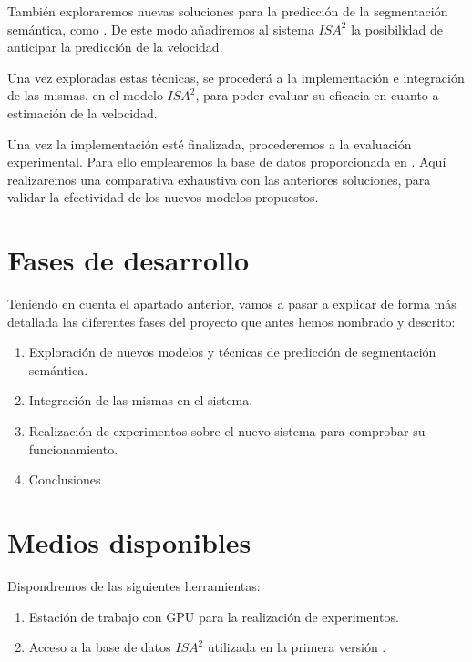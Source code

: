 \documentclass[12pt,oneside,a4paper]{article}
\begin{document}
También exploraremos nuevas soluciones para la predicción de la segmentación semántica, como \cite{segmpred}. De este modo añadiremos al sistema $ISA^2$ la posibilidad de anticipar la predicción de la velocidad.

Una vez exploradas estas técnicas, se procederá a la implementación e integración de las mismas, en el modelo $ISA^2$, para poder evaluar su eficacia en cuanto a estimación de la velocidad. 

Una vez la implementación esté finalizada, procederemos a la evaluación experimental. Para ello emplearemos la base de datos proporcionada en \cite{isa2}. Aquí realizaremos una comparativa exhaustiva con las anteriores soluciones, para validar la efectividad de los nuevos modelos propuestos.


\section{Fases de desarrollo}

Teniendo en cuenta el apartado anterior, vamos a pasar a explicar de forma más detallada las diferentes fases del proyecto que antes hemos nombrado y descrito:

\begin{enumerate}
 \item Exploración de nuevos modelos y técnicas de predicción de segmentación semántica.
 \item Integración de las mismas en el sistema.
 \item Realización de experimentos sobre el nuevo sistema para comprobar su funcionamiento.
 \item Conclusiones
\end{enumerate}

\section{Medios disponibles}

Dispondremos de las siguientes herramientas:

\begin{enumerate}
	\item Estación de trabajo con GPU para la realización de experimentos.
	\item Acceso a la base de datos $ISA^2$ utilizada en la primera versión \cite{isa2}.
\end{enumerate}

 








\end{document}
